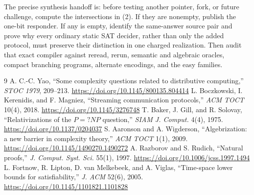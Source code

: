 \documentclass[11pt]{article}
\begin{document}
The precise synthesis handoff is: before testing another pointer, fork, or
future challenge, compute the intersections in (2).  If they are nonempty,
publish the one-bit responder.  If any is empty, identify the same-answer
source pair and prove why every ordinary static SAT decider, rather than only
the added protocol, must preserve their distinction in one charged
realization.  Then audit that exact compiler against reread, rerun, semantic
and algebraic oracles, compact branching programs, alternate encodings, and
the easy families.

\begin{thebibliography}{9}
 A. C.-C. Yao, ``Some complexity questions related to
distributive computing,'' \emph{STOC 1979}, 209--213.
\url{https://doi.org/10.1145/800135.804414}
 L. Boczkowski, I. Kerenidis, and F. Magniez,
``Streaming communication protocols,'' \emph{ACM TOCT} 10(4), 2018.
\url{https://doi.org/10.1145/3276748}
 T. Baker, J. Gill, and R. Solovay,
``Relativizations of the $P=?NP$ question,'' \emph{SIAM J. Comput.} 4(4), 1975.
\url{https://doi.org/10.1137/0204037}
 S. Aaronson and A. Wigderson,
``Algebrization: a new barrier in complexity theory,'' \emph{ACM TOCT} 1(1), 2009.
\url{https://doi.org/10.1145/1490270.1490272}
 A. Razborov and S. Rudich, ``Natural proofs,''
\emph{J. Comput. Syst. Sci.} 55(1), 1997.
\url{https://doi.org/10.1006/jcss.1997.1494}
 L. Fortnow, R. Lipton, D. van Melkebeek, and A. Viglas,
``Time-space lower bounds for satisfiability,'' \emph{J. ACM} 52(6), 2005.
\url{https://doi.org/10.1145/1101821.1101828}
\end{thebibliography}

\end{document}
